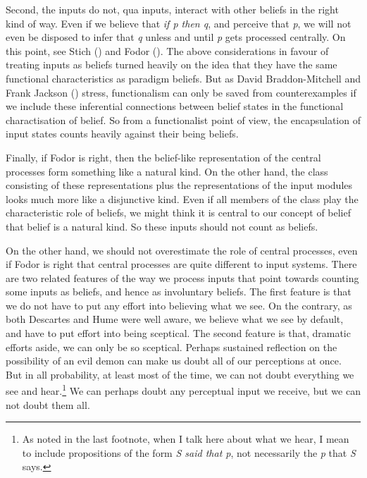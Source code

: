 \documentclass[
  11pt,
  letterpaper,
  DIV=11,
  numbers=noendperiod,
  twoside]{scrartcl}
\begin{document}
Second, the inputs do not, qua inputs, interact with other beliefs in
the right kind of way. Even if we believe that \emph{if p then q}, and
perceive that \emph{p}, we will not even be disposed to infer that
\emph{q} unless and until \emph{p} gets processed centrally. On this
point, see Stich () and Fodor
(). The above considerations in
favour of treating inputs as beliefs turned heavily on the idea that
they have the same functional characteristics as paradigm beliefs. But
as David Braddon-Mitchell and Frank Jackson
() stress, functionalism can
only be saved from counterexamples if we include these inferential
connections between belief states in the functional charactisation of
belief. So from a functionalist point of view, the encapsulation of
input states counts heavily against their being beliefs.

Finally, if Fodor is right, then the belief-like representation of the
central processes form something like a natural kind. On the other hand,
the class consisting of these representations plus the representations
of the input modules looks much more like a disjunctive kind. Even if
all members of the class play the characteristic role of beliefs, we
might think it is central to our concept of belief that belief is a
natural kind. So these inputs should not count as beliefs.

On the other hand, we should not overestimate the role of central
processes, even if Fodor is right that central processes are quite
different to input systems. There are two related features of the way we
process inputs that point towards counting some inputs as beliefs, and
hence as involuntary beliefs. The first feature is that we do not have
to put any effort into believing what we see. On the contrary, as both
Descartes and Hume were well aware, we believe what we see by default,
and have to put effort into being sceptical. The second feature is that,
dramatic efforts aside, we can only be so sceptical. Perhaps sustained
reflection on the possibility of an evil demon can make us doubt all of
our perceptions at once. But in all probability, at least most of the
time, we can not doubt everything we see and hear.\footnote{As noted in
  the last footnote, when I talk here about what we hear, I mean to
  include propositions of the form \emph{S said that p}, not necessarily
  the \emph{p} that \emph{S} says.} We can perhaps doubt any perceptual
input we receive, but we can not doubt them all.
\end{document}
